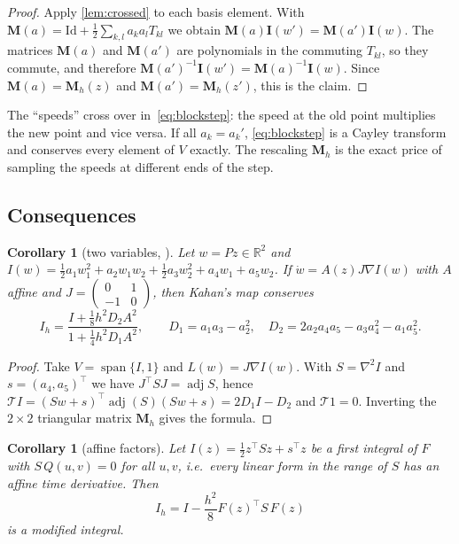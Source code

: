 \documentclass[11pt,a4paper]{article}
\newtheorem{corollary}[theorem]{Corollary}
\theoremstyle{definition}
\theoremstyle{remark}
\newcommand{\R}{\mathbb{R}}
\newcommand{\Id}{\mathrm{Id}}
\newcommand{\T}{\mathcal{T}}
\newcommand{\bI}{\mathbf{I}}
\newcommand{\bM}{\mathbf{M}}
\newcommand{\tr}{^{\!\top}}
\DeclareMathOperator{\spn}{span}
\begin{document}
\begin{proof}
Apply \cref{lem:crossed} to each basis element. With $\bM(a)=\Id+\frac12\sum_{k,l}a_ka_lT_{kl}$ we obtain
$\bM(a)\bI(w')=\bM(a')\bI(w)$. The matrices $\bM(a)$ and $\bM(a')$ are polynomials in the commuting $T_{kl}$,
so they commute, and therefore $\bM(a')^{-1}\bI(w')=\bM(a)^{-1}\bI(w)$. Since $\bM(a)=\bM_h(z)$ and
$\bM(a')=\bM_h(z')$, this is the claim.
\end{proof}

The ``speeds'' cross over in~\eqref{eq:blockstep}: the speed at the old point multiplies the new point and
vice versa. If all $a_k=a_k'$, \eqref{eq:blockstep} is a Cayley transform and conserves every element of $V$
exactly. The rescaling $\bM_h$ is the exact price of sampling the speeds at different ends of the step.

\subsection{Consequences}

\begin{corollary}[two variables, \cite{CMOQ19}]\label{cor:twovar}
Let $w=Pz\in\R^2$ and $I(w)=\frac12a_1w_1^2+a_2w_1w_2+\frac12a_3w_2^2+a_4w_1+a_5w_2$. If
$\dot w=A(z)J\nabla I(w)$ with $A$ affine and $J=\left(\begin{smallmatrix}0&1\\-1&0\end{smallmatrix}\right)$,
then Kahan's map conserves
\[
I_h=\frac{I+\frac18h^2D_2A^2}{1+\frac14h^2D_1A^2},\qquad D_1=a_1a_3-a_2^2,\quad D_2=2a_2a_4a_5-a_3a_4^2-a_1a_5^2.
\]
\end{corollary}

\begin{proof}
Take $V=\spn\{I,1\}$ and $L(w)=J\nabla I(w)$. With $S=\nabla^2I$ and $s=(a_4,a_5)\tr$ we have
$J\tr SJ=\operatorname{adj}S$, hence
$\T I=(Sw+s)\tr\operatorname{adj}(S)(Sw+s)=2D_1I-D_2$ and $\T1=0$. Inverting the $2\times2$ triangular matrix
$\bM_h$ gives the formula.
\end{proof}

\begin{corollary}[affine factors]\label{cor:affine}
Let $I(z)=\frac12z\tr Sz+s\tr z$ be a first integral of $F$ with $S\,Q(u,v)=0$ for all $u,v$, i.e.\ every
linear form in the range of $S$ has an affine time derivative. Then
\[
I_h=I-\frac{h^2}{8}F(z)\tr S\,F(z)
\]
is a modified integral.
\end{corollary}
\end{document}
